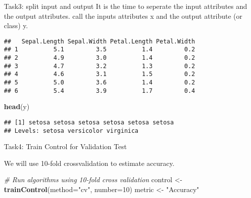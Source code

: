 \documentclass[
]{article}
\newenvironment{Shaded}{\begin{snugshade}}{\end{snugshade}}
\newcommand{\AttributeTok}[1]{\textcolor[rgb]{0.13,0.29,0.53}{#1}}
\newcommand{\CommentTok}[1]{\textcolor[rgb]{0.56,0.35,0.01}{\textit{#1}}}
\newcommand{\DecValTok}[1]{\textcolor[rgb]{0.00,0.00,0.81}{#1}}
\newcommand{\FunctionTok}[1]{\textcolor[rgb]{0.13,0.29,0.53}{\textbf{#1}}}
\newcommand{\NormalTok}[1]{#1}
\newcommand{\OtherTok}[1]{\textcolor[rgb]{0.56,0.35,0.01}{#1}}
\newcommand{\SpecialCharTok}[1]{\textcolor[rgb]{0.81,0.36,0.00}{\textbf{#1}}}
\newcommand{\StringTok}[1]{\textcolor[rgb]{0.31,0.60,0.02}{#1}}
\begin{document}
Task3: split input and output It is the time to seperate the input
attributes and the output attributes. call the inputs attributes x and
the output attribute (or class) y.

\begin{Shaded}
\end{Shaded}

\begin{verbatim}
##   Sepal.Length Sepal.Width Petal.Length Petal.Width
## 1          5.1         3.5          1.4         0.2
## 2          4.9         3.0          1.4         0.2
## 3          4.7         3.2          1.3         0.2
## 4          4.6         3.1          1.5         0.2
## 5          5.0         3.6          1.4         0.2
## 6          5.4         3.9          1.7         0.4
\end{verbatim}

\begin{Shaded}
\begin{Highlighting}[]
\FunctionTok{head}\NormalTok{(y)}
\end{Highlighting}
\end{Shaded}

\begin{verbatim}
## [1] setosa setosa setosa setosa setosa setosa
## Levels: setosa versicolor virginica
\end{verbatim}

Task4: Train Control for Validation Test

We will use 10-fold crossvalidation to estimate accuracy.

\begin{Shaded}
\begin{Highlighting}[]
\CommentTok{\# Run algorithms using 10{-}fold cross validation}
\NormalTok{control }\OtherTok{\textless{}{-}} \FunctionTok{trainControl}\NormalTok{(}\AttributeTok{method=}\StringTok{"cv"}\NormalTok{, }\AttributeTok{number=}\DecValTok{10}\NormalTok{)}
\NormalTok{metric }\OtherTok{\textless{}{-}} \StringTok{"Accuracy"}
\end{Highlighting}
\end{Shaded}
\end{document}
